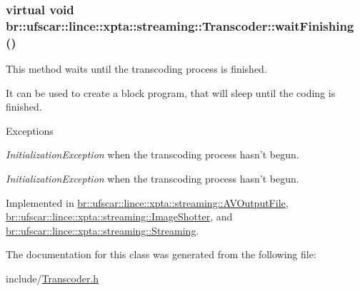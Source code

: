 \hypertarget{classbr_1_1ufscar_1_1lince_1_1xpta_1_1streaming_1_1Transcoder_ac060d2266b2b4b41b1f62eb0c6a48be3}{
\subsubsection[{waitFinishing}]{\setlength{\rightskip}{0pt plus 5cm}virtual void br::ufscar::lince::xpta::streaming::Transcoder::waitFinishing ()}}
\label{classbr_1_1ufscar_1_1lince_1_1xpta_1_1streaming_1_1Transcoder_ac060d2266b2b4b41b1f62eb0c6a48be3}


This method waits until the transcoding process is finished. 

It can be used to create a block program, that will sleep until the coding is finished. 
\begin{DoxyExceptions}{Exceptions}
\item[{\em InitializationException}]when the transcoding process hasn't begun. \item[{\em InitializationException}]when the transcoding process hasn't begun. \end{DoxyExceptions}


Implemented in \hyperlink{classbr_1_1ufscar_1_1lince_1_1xpta_1_1streaming_1_1AVOutputFile_a488643d156229813598cc413cc63a920}{br::ufscar::lince::xpta::streaming::AVOutputFile}, \hyperlink{classbr_1_1ufscar_1_1lince_1_1xpta_1_1streaming_1_1ImageShotter_a68b16838853a0703f75ba80c5b31ee94}{br::ufscar::lince::xpta::streaming::ImageShotter}, and \hyperlink{classbr_1_1ufscar_1_1lince_1_1xpta_1_1streaming_1_1Streaming_ab0f85c46efde46613539316340daa721}{br::ufscar::lince::xpta::streaming::Streaming}.



The documentation for this class was generated from the following file:\begin{DoxyCompactItemize}
\item 
include/\hyperlink{Transcoder_8h}{Transcoder.h}\end{DoxyCompactItemize}
